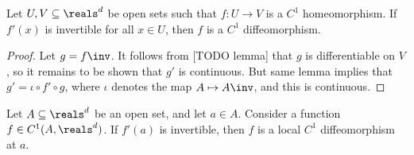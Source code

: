 \documentclass[article, a4paper, 11pt, oneside]{memoir}
\numberwithin{equation}{chapter}
\begin{document}
\begin{proposition}
    Let $U, V \subseteq \reals^d$ be open sets such that $f \colon U \to V$ is a $C^1$ homeomorphism. If $f'(x)$ is invertible for all $x \in U$, then $f$ is a $C^1$ diffeomorphism.
\end{proposition}

\begin{proof}
    Let $g = f\inv$. It follows from [TODO lemma] that $g$ is differentiable on $V$, so it remains to be shown that $g'$ is continuous. But same lemma implies that $g' = \iota \circ f' \circ g$, where $\iota$ denotes the map $A \mapsto A\inv$, and this is continuous.
\end{proof}


\begin{theorem}
    Let $A \subseteq \reals^d$ be an open set, and let $a \in A$. Consider a function $f \in C^1(A,\reals^d)$. If $f'(a)$ is invertible, then $f$ is a local $C^1$ diffeomorphism at $a$.
\end{theorem}
\end{document}
